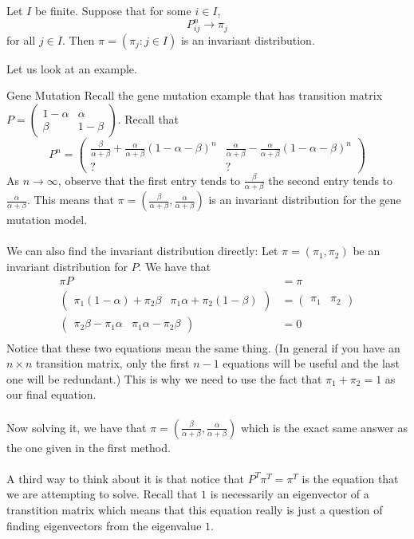 \documentclass[a4paper]{article}
\begin{document}
\begin{thm}{}{} Let $I$ be finite. Suppose that for some $i\in I$, $$P_{ij}^n\to\pi_j$$ for all $j\in I$. Then $\pi=(\pi_j:j\in I)$ is an invariant distribution. 
\end{thm}

Let us look at an example. 

\begin{eg}{Gene Mutation}{} Recall the gene mutation example that has transition matrix $P=\begin{pmatrix}
1-\alpha & \alpha\\
\beta & 1-\beta
\end{pmatrix}$. Recall that $$P^n=\begin{pmatrix}
\frac{\beta}{\alpha+\beta}+\frac{\alpha}{\alpha+\beta}(1-\alpha-\beta)^n & \frac{\alpha}{\alpha+\beta}-\frac{\alpha}{\alpha+\beta}(1-\alpha-\beta)^n\\
? & ?
\end{pmatrix}$$
As $n\to\infty$, observe that the first entry tends to $\frac{\beta}{\alpha+\beta}$ the second entry tends to $\frac{\alpha}{\alpha+\beta}$. This means that $\pi=\left(\frac{\beta}{\alpha+\beta},\frac{\alpha}{\alpha+\beta}\right)$ is an invariant distribution for the gene mutation model. \\~\\
We can also find the invariant distribution directly: Let $\pi=(\pi_1,\pi_2)$ be an invariant distribution for $P$. We have that 
\begin{align*}
\pi P&=\pi\\
\begin{pmatrix}
\pi_1(1-\alpha)+\pi_2\beta & \pi_1\alpha+\pi_2(1-\beta)
\end{pmatrix}&=\begin{pmatrix}
\pi_1 & \pi_2
\end{pmatrix}\\
\begin{pmatrix}
\pi_2\beta-\pi_1\alpha & \pi_1\alpha-\pi_2\beta
\end{pmatrix}&=0\\
\end{align*} Notice that these two equations mean the same thing. (In general if you have an $n\times n$ transition matrix, only the first $n-1$ equations will be useful and the last one will be redundant.) This is why we need to use the fact that $\pi_1+\pi_2=1$ as our final equation. \\~\\
Now solving it, we have that $\pi=\left(\frac{\beta}{\alpha+\beta},\frac{\alpha}{\alpha+\beta}\right)$ which is the exact same answer as the one given in the first method. \\~\\
A third way to think about it is that notice that $P^T\pi^T=\pi^T$ is the equation that we are attempting to solve. Recall that $1$ is necessarily an eigenvector of a transtition matrix which means that this equation really is just a question of finding eigenvectors from the eigenvalue $1$. 
\end{eg}
\end{document}
